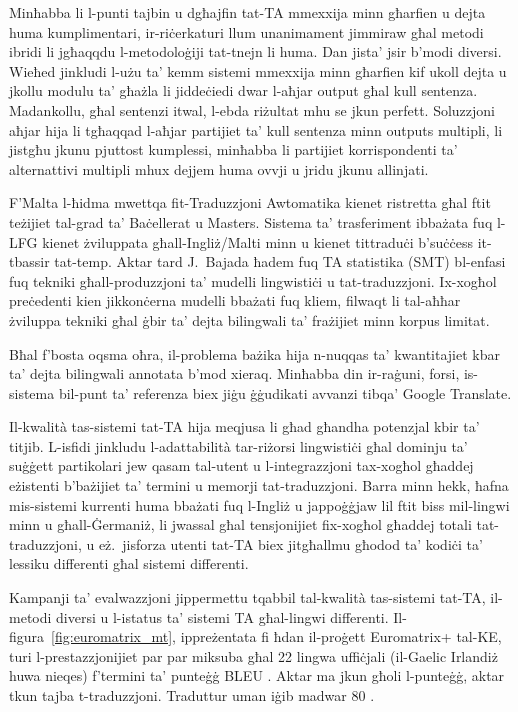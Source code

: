 \begin{multicols}{2}
Minħabba li l-punti tajbin u dgħajfin tat-TA mmexxija minn għarfien u dejta huma kumplimentari, ir-riċerkaturi llum unanimament jimmiraw għal metodi ibridi li jgħaqqdu l-metodoloġiji tat-tnejn li huma. Dan jista’ jsir b’modi diversi. Wieħed jinkludi l-użu ta’ kemm sistemi mmexxija minn għarfien kif ukoll dejta u jkollu modulu ta’ għażla li jiddeċiedi dwar l-aħjar output għal kull sentenza. Madankollu, għal sentenzi itwal, l-ebda riżultat mhu se jkun perfett. Soluzzjoni aħjar hija li tgħaqqad l-aħjar partijiet ta’ kull sentenza minn outputs multipli, li jistgħu jkunu pjuttost kumplessi, minħabba li partijiet korrispondenti ta’ alternattivi multipli mhux dejjem huma ovvji u jridu jkunu allinjati.


F’Malta l-ħidma mwettqa fit-Traduzzjoni Awtomatika kienet ristretta għal ftit teżijiet tal-grad ta’ Baċellerat u Masters. Sistema ta’ trasferiment ibbażata fuq l-LFG kienet żviluppata għall-Ingliż/Malti minn \cite{Farrugia:2000} u kienet tittraduċi b’suċċess it-tbassir tat-temp. Aktar tard J.~Bajada \cite{Bajada:2004, Bajada:2009} ħadem fuq TA statistika (SMT) bl-enfasi fuq tekniki għall-produzzjoni ta’ mudelli lingwistiċi u tat-traduzzjoni. Ix-xogħol preċedenti kien jikkonċerna mudelli bbażati fuq kliem, filwaqt li tal-aħħar żviluppa tekniki għal ġbir ta’ dejta bilingwali ta’ frażijiet minn korpus limitat.

Bħal f'bosta oqsma oħra, il-problema bażika hija n-nuqqas ta’ kwantitajiet kbar ta’ dejta bilingwali annotata b’mod xieraq. Minħabba din ir-raġuni, forsi, is-sistema bil-punt ta’ referenza biex jiġu ġġudikati avvanzi tibqa’ Google Translate.

Il-kwalità tas-sistemi tat-TA hija meqjusa li għad għandha potenzjal kbir ta’ titjib. L-isfidi jinkludu l-adattabilità tar-riżorsi lingwistiċi għal dominju ta’ suġġett partikolari jew qasam tal-utent u l-integrazzjoni tax-xogħol għaddej eżistenti b’bażijiet ta’ termini u memorji tat-traduzzjoni. Barra minn hekk, ħafna mis-sistemi kurrenti huma bbażati fuq l-Ingliż u jappoġġjaw lil ftit biss mil-lingwi minn u għall-Ġermaniż, li jwassal għal tensjonijiet fix-xogħol għaddej totali tat-traduzzjoni, u eż.~jisforza utenti tat-TA biex jitgħallmu għodod ta’ kodiċi ta’ lessiku differenti għal sistemi differenti.

Kampanji ta’ evalwazzjoni jippermettu tqabbil tal-kwalità tas-sistemi tat-TA, il-metodi diversi u l-istatus ta’ sistemi TA għal-lingwi differenti. Il-figura~\ref{fig:euromatrix_mt}, ippreżentata fi ħdan il-proġett Euromatrix+ tal-KE, turi l-prestazzjonijiet par par miksuba għal 22 lingwa uffiċjali (il-Gaelic Irlandiż huwa nieqes) f'termini ta’ punteġġ BLEU \cite{bleu1}. Aktar ma jkun għoli l-punteġġ, aktar tkun tajba t-traduzzjoni. Traduttur uman iġib madwar 80 \cite{bleu1}.


\end{multicols}
